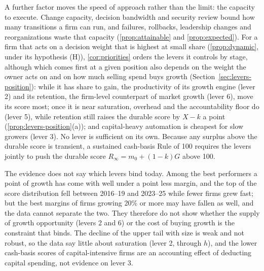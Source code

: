 A further factor moves the speed of approach rather than the limit: the capacity to execute. Change capacity, decision bandwidth and security review bound how many transitions a firm can run, and failures, rollbacks, leadership changes and reorganizations waste that capacity (\autoref{prop:attainable} and \autoref{prop:expected}). For a firm that acts on a decision weight that is highest at small share (\autoref{prop:dynamic}, under its hypothesis (H)), \autoref{cor:priorities} orders the levers it controls by stage, although which comes first at a given position also depends on the weight the owner acts on and on how much selling spend buys growth (Section~\ref{sec:levers-position}): while it has share to gain, the productivity of its growth engine (lever 2) and its retention, the firm-level counterpart of market growth (lever 6), move its score most; once it is near saturation, overhead and the accountability floor do (lever 5), while retention still raises the durable score by $X-k$ a point (\autoref{prop:levers-position}(a)); and capital-heavy automation is cheapest for slow growers (lever 3). No lever is sufficient on its own. Because any surplus above the durable score is transient, a sustained cash-basis Rule of 100 requires the levers jointly to push the durable score $R_\infty=m_0+(1-k)G$ above 100.

The evidence does not say which levers bind today. Among the best performers a point of growth has come with well under a point less margin, and the top of the score distribution fell between 2016--19 and 2023--25 while fewer firms grew fast; but the best margins of firms growing 20\% or more may have fallen as well, and the data cannot separate the two. They therefore do not show whether the supply of growth opportunity (levers 2 and 6) or the cost of buying growth is the constraint that binds. The decline of the upper tail with size is weak and not robust, so the data say little about saturation (lever 2, through $h$), and the lower cash-basis scores of capital-intensive firms are an accounting effect of deducting capital spending, not evidence on lever 3.


